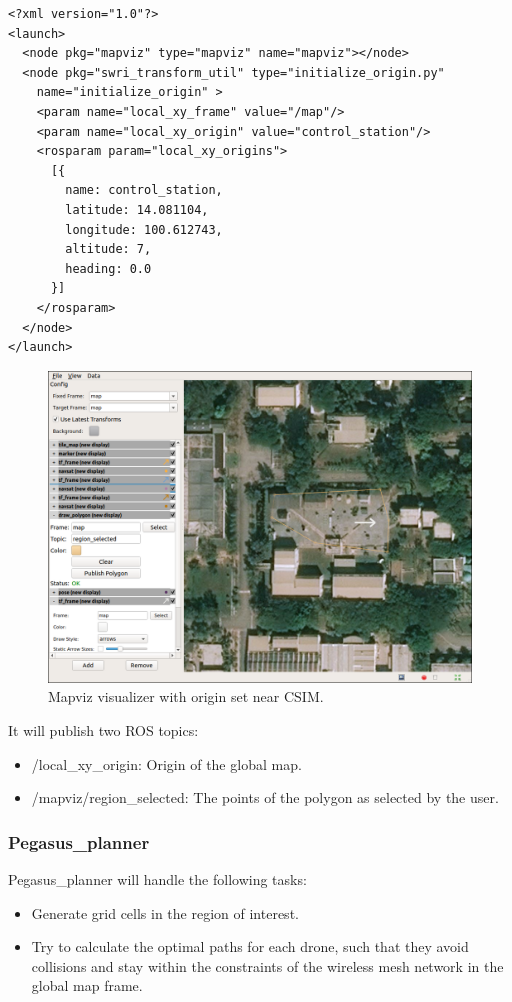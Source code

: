 \begin{verbatim}
<?xml version="1.0"?>
<launch>
  <node pkg="mapviz" type="mapviz" name="mapviz"></node>
  <node pkg="swri_transform_util" type="initialize_origin.py"
    name="initialize_origin" >
    <param name="local_xy_frame" value="/map"/>
    <param name="local_xy_origin" value="control_station"/>
    <rosparam param="local_xy_origins">
      [{
        name: control_station,
        latitude: 14.081104,
        longitude: 100.612743,
        altitude: 7,
        heading: 0.0
      }]
    </rosparam>
  </node>
</launch>
\end{verbatim}

\begin{figure} \label{fig:mapviz-screenshot}
  \centering
  \includegraphics[width=5in]{figures/methodology/gcs/mapviz/screenshot}
  \caption[Mapviz visualizer]{\small Mapviz visualizer with origin set near CSIM.}
\end{figure}

It will publish two ROS topics:
\begin{itemize}
  \item /local\_xy\_origin: Origin of the global map.
  \item /mapviz/region\_selected: The points of the polygon as selected by the user.
\end{itemize}

\subsubsection{Pegasus\_planner}

Pegasus\_planner will handle the following tasks:
\begin{itemize}
  \item Generate grid cells in the region of interest.
  \item Try to calculate the optimal paths for each drone, such that they avoid collisions and stay within the constraints of the wireless mesh network in the global map frame.
\end{itemize}

